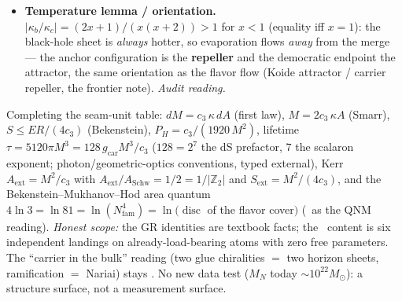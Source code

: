 \documentclass[11pt,a4paper]{article}
\newcommand{\cthree}{c_3}
\newcommand{\Z}{\mathbb{Z}}
\begin{document}
\begin{keybox}[Nariai $=$ the anchor; the Koide $2/3$ is the entropy bound \mE\ (\veri{v101\_horizon\_anchor.py})]
\begin{itemize}
sheet $\Z_2$ and of the split $N_{\mathrm{fam}}$-linear cover $(3x{+}2)(3x{+}5)$ of the flavor sector (Fig.~\ref{fig:sdscover}).
The two branch structures share one $N_{\mathrm{fam}}$-linear ramification: the affine map
$q=\tfrac72+\tfrac{N_{\mathrm{fam}}^2}{2}m$ carries the SdS branch points $m={\pm}1/N_{\mathrm{fam}}$ onto the
flavor branch labels $\{2,5\}=\{|\Z_2|,g_{\mathrm{car}}\}$ (midpoint $7/2$). This is an exact \emph{relabeling} --- the
shared invariant is the $2/3$ ramification, not the map, which exists for any two pairs of points --- so it
is recorded as a \mC\ structural alignment, not a theorem ().
\item \textbf{Temperature lemma / orientation.} $|\kappa_b/\kappa_c|=(2x{+}1)/(x(x{+}2))>1$ for $x<1$
(equality iff $x=1$): the black-hole sheet is \emph{always} hotter, so evaporation flows \emph{away} from
the merge --- the anchor configuration is the \textbf{repeller} and the democratic endpoint the attractor,
the same orientation as the flavor flow (Koide attractor / carrier repeller, the frontier note). \emph{Audit reading.}
\end{itemize}
Completing the seam-unit table: $dM=\cthree\,\kappa\,dA$ (first law), $M=2\cthree\,\kappa A$ (Smarr),
$S\le ER/(4\cthree)$ (Bekenstein), $P_H=\cthree/(1920\,M^2)$, lifetime
$\tau=5120\pi M^3=128\,g_{\mathrm{car}}M^3/\cthree$ ($128=2^7$ the dS prefactor, $7$ the scalaron exponent;
photon/geometric-optics conventions, typed external), Kerr $A_{\mathrm{ext}}=M^2/\cthree$ with
$A_{\mathrm{ext}}/A_{\mathrm{Schw}}=1/2=1/|\Z_2|$ and $S_{\mathrm{ext}}=M^2/(4\cthree)$, and the
Bekenstein--Mukhanov--Hod area quantum $4\ln3=\ln81=\ln(N_{\mathrm{fam}}^4)=\ln(\operatorname{disc}$ of the flavor
cover$)$ (\mC\ as the QNM reading). \emph{Honest scope:} the GR identities are textbook facts; the \mE\
content is six independent landings on already-load-bearing atoms with zero free parameters. The
``carrier in the bulk'' reading (two glue chiralities $=$ two horizon sheets, ramification $=$ Nariai)
stays \mC. No new data test ($M_N$ today $\sim10^{22}M_\odot$): a structure surface, not a measurement
surface.
\end{keybox}
\end{document}
